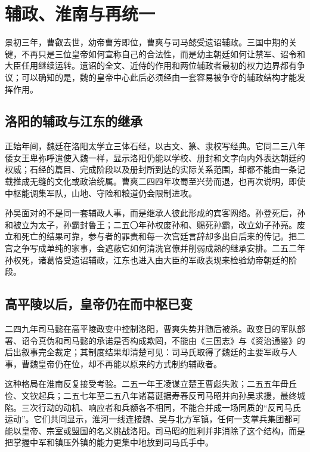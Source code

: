 \section{辅政、淮南与再统一}
\label{sec:three-kingdoms-regencies-reunification}

景初三年，曹叡去世，幼帝曹芳即位，曹爽与司马懿受遗诏辅政。三国中期的关键，不再只是三位皇帝如何宣称自己的合法性，而是幼主朝廷如何让禁军、诏令和大臣任用继续运转。遗诏的全文、近侍的作用和两位辅政者最初的权力边界都有争议；可以确知的是，魏的皇帝中心此后必须经由一套容易被争夺的辅政结构才能发挥作用。

\subsection{洛阳的辅政与江东的继承}

正始年间，魏廷在洛阳太学立三体石经，以古文、篆、隶校写经典。它同二三八年倭女王卑弥呼遣使入魏一样，显示洛阳仍能以学校、册封和文字向内外表达朝廷的权威；石经的篇目、完成阶段以及册封所到达的实际关系范围，却都不能由一条记载推成无缝的文化或政治统属。曹爽二四四年攻蜀至兴势而退，也再次说明，即使中枢能调集军队，山地、守险和粮道仍会限制进攻。

孙吴面对的不是同一套辅政人事，而是继承人彼此形成的宾客网络。孙登死后，孙和被立为太子，孙霸封鲁王；二五〇年孙权废孙和、赐死孙霸，改立幼子孙亮。废立和死亡的结果可靠，参与者的罪责和每一次宫廷言辞却多出自后来的传记。把二宫之争写成单纯的家事，会遮蔽它如何清洗官僚并削弱成熟的继承安排。二五二年孙权死，诸葛恪受遗诏辅政，江东也进入由大臣的军政表现来检验幼帝朝廷的阶段。

\subsection{高平陵以后，皇帝仍在而中枢已变}

二四九年司马懿在高平陵政变中控制洛阳，曹爽失势并随后被杀。政变日的军队部署、诏令真伪和司马懿的承诺是否构成欺罔，不能由《三国志》与《资治通鉴》的后出叙事完全裁定；其制度结果却清楚可见：司马氏取得了魏廷的主要军政与人事，曹魏皇帝仍在位，却不再能以原来的方式制约辅政者。

这种格局在淮南反复接受考验。二五一年王凌谋立楚王曹彪失败；二五五年毌丘俭、文钦起兵；二五七年至二五八年诸葛诞据寿春反司马昭并向孙吴求援，最终城陷。三次行动的动机、响应者和兵额各不相同，不能合并成一场同质的“反司马氏运动”。它们共同显示，淮河一线连接魏、吴与北方军镇，任何一支掌兵集团都可能以皇帝、宗室或盟国的名义挑战洛阳。司马昭的胜利并非消除了这个结构，而是把掌握中军和镇压外镇的能力更集中地放到司马氏手中。

